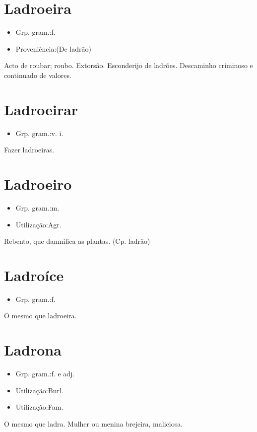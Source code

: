 \section{Ladroeira}
\begin{itemize}
\item {Grp. gram.:f.}
\end{itemize}
\begin{itemize}
\item {Proveniência:(De \textunderscore ladrão\textunderscore )}
\end{itemize}
Acto de roubar; roubo.
Extorsão.
Esconderijo de ladrões.
Descaminho criminoso e continuado de valores.
\section{Ladroeirar}
\begin{itemize}
\item {Grp. gram.:v. i.}
\end{itemize}
Fazer ladroeiras.
\section{Ladroeiro}
\begin{itemize}
\item {Grp. gram.:m.}
\end{itemize}
\begin{itemize}
\item {Utilização:Agr.}
\end{itemize}
Rebento, que damnifica as plantas.
(Cp. \textunderscore ladrão\textunderscore )
\section{Ladroíce}
\begin{itemize}
\item {Grp. gram.:f.}
\end{itemize}
O mesmo que \textunderscore ladroeira\textunderscore .
\section{Ladrona}
\begin{itemize}
\item {Grp. gram.:f.  e  adj.}
\end{itemize}
\begin{itemize}
\item {Utilização:Burl.}
\end{itemize}
\begin{itemize}
\item {Utilização:Fam.}
\end{itemize}
O mesmo que \textunderscore ladra\textunderscore .
Mulher ou menina brejeira, maliciosa.
